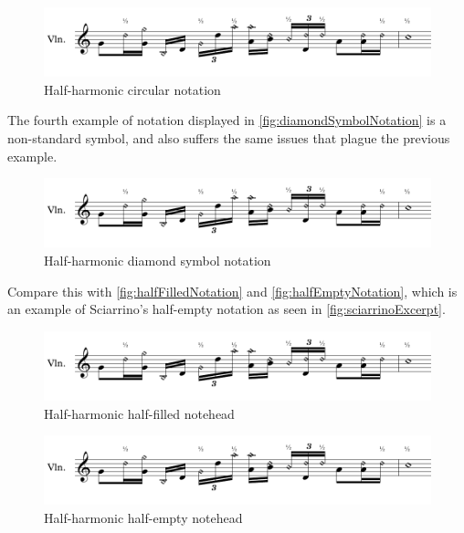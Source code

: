 \begin{figure}
    \includegraphics[page=3,width=\textwidth]{resources/halfharmonicsSingleExamples.pdf}
    \caption{Half-harmonic circular notation}\label{fig:circleExample}
  \end{figure}

The fourth example of notation displayed in \autoref{fig:diamondSymbolNotation} is a non-standard symbol, and also suffers the same issues that plague the previous example.

\begin{figure}
  \includegraphics[page=4,width=\textwidth]{resources/halfharmonicsSingleExamples.pdf}
  \caption{Half-harmonic diamond symbol notation}\label{fig:diamondSymbolNotation}
\end{figure}


Compare this with \autoref{fig:halfFilledNotation} and \autoref{fig:halfEmptyNotation}, which is an example of Sciarrino's half-empty notation as seen in \autoref{fig:sciarrinoExcerpt}.

\begin{figure}
  \includegraphics[page=5,width=\textwidth]{resources/halfharmonicsSingleExamples.pdf}
  \caption{Half-harmonic half-filled notehead}\label{fig:halfFilledNotation}
\end{figure}


\begin{figure}
  \includegraphics[page=2,width=\textwidth]{resources/halfharmonicsSingleExamples.pdf}
  \caption{Half-harmonic half-empty notehead}\label{fig:halfEmptyNotation}
\end{figure}


